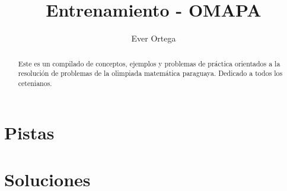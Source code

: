 \documentclass{scrreprt}
\title{Entrenamiento - OMAPA}
\author{Ever Ortega}
\begin{document}
\maketitle
\begin{abstract}
	Este es un compilado de conceptos,
	ejemplos y problemas de práctica orientados
	a la resolución de problemas
	de la olimpiada matemática paraguaya.
	Dedicado a todos los cetenianos.
\end{abstract}

\tableofcontents
\clearpage

% 






\chapter{Pistas}
\printhint

\chapter{Soluciones}
\printsolutions
\end{document}
